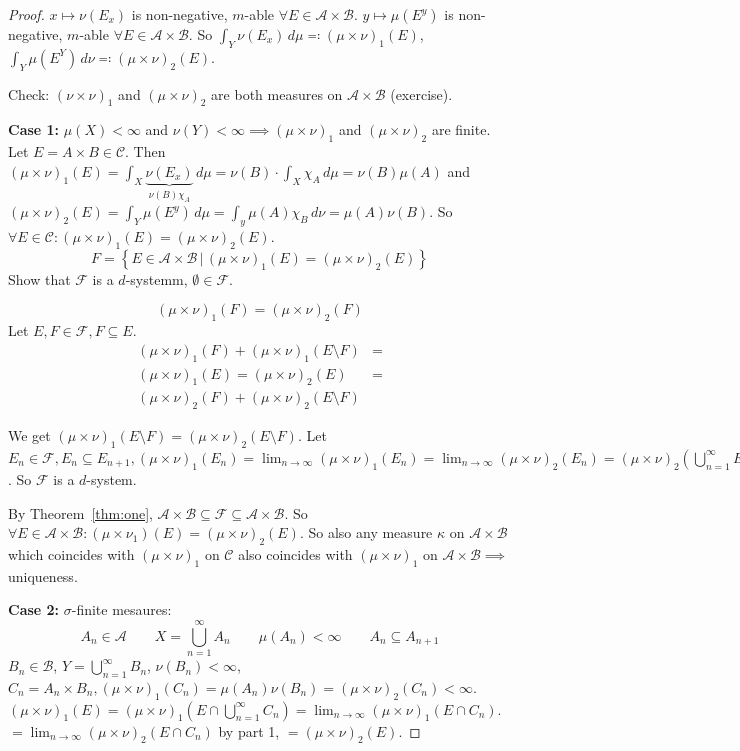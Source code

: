 \documentclass{article}
\newcommand{\setdef}[2]{\left\{\left.#1\,\right|\,#2\right\}}
\newcommand{\mtn}{(\mu\times\nu)} %
\begin{document}
\begin{proof}
  $x \mapsto \nu(E_x)$ is non-negative, $m$-able $\forall E \in \mathcal A \times \mathcal B$.
  $y \mapsto \mu(E^y)$ is non-negative, $m$-able $\forall E \in \mathcal A \times \mathcal B$.
  So $\int_Y \nu(E_x) \, d\mu \eqqcolon (\mu \times \nu)_1 (E)$, $\int_Y \mu(E^Y) \, d\nu \eqqcolon (\mu \times \nu)_2 (E)$.

  Check: $(\nu \times \nu)_1$ and $(\mu \times \nu)_2$ are both measures on $\mathcal A \times \mathcal B$ (exercise).

  \textbf{Case 1:} $\mu(X) < \infty$ and $\nu(Y) < \infty \implies (\mu \times \nu)_1$ and $(\mu \times \nu)_2$ are finite.
  Let $E = A \times B \in \mathcal C$. Then $(\mu \times \nu)_1 (E) = \int_X \underbrace{\nu(E_x)}_{\nu(B) \chi_A} \, d\mu = \nu(B) \cdot \int_X \chi_A \, d\mu = \nu(B) \mu(A)$ and $(\mu \times \nu)_2(E) = \int_Y \mu(E^y) \, d\mu = \int_y \mu(A) \chi_B \, d\nu = \mu(A) \nu(B)$.
  So $\forall E \in \mathcal C: (\mu \times \nu)_1 (E) = (\mu \times \nu)_2(E)$.
  \[ F = \setdef{E \in \mathcal A \times \mathcal B}{(\mu \times \nu)_1 (E) = (\mu \times \nu)_2 (E)} \]
  Show that $\mathcal F$ is a $d$-systemm, $\emptyset \in \mathcal F$.

  \[ (\mu \times \nu)_1(F) = (\mu \times \nu)_2(F) \]
  Let $E, F \in \mathcal F, F \subseteq E$.
  \begin{align*}
    (\mu \times \nu)_1 (F) + (\mu \times \nu)_1 (E \setminus F) &= \\
    (\mu \times \nu)_1 (E) = (\mu \times \nu)_2 (E) &= \\
    (\mu \times \nu)_2 (F) + (\mu \times \nu)_2 (E \setminus F) &
  \end{align*}

  We get $(\mu \times \nu)_1 (E \setminus F) = (\mu \times \nu)_2 (E \setminus F)$.
  Let $E_n \in \mathcal F, E_n \subseteq E_{n+1}, \mtn_1(E_n) = \lim_{n\to\infty}\mtn_1(E_n) = \lim_{n\to\infty}\mtn_2(E_n) = \mtn_2(\bigcup_{n=1}^\infty E_n)$.
  So $\mathcal F$ is a $d$-system.

  By Theorem~\ref{thm:one}, $\mathcal A \times \mathcal B \subseteq \mathcal F \subseteq \mathcal A \times \mathcal B$.
  So $\forall E \in \mathcal A \times \mathcal B: (\mu \times \nu_1)(E) = (\mu \times \nu)_2(E)$.
  So also any measure $\kappa$ on $\mathcal A \times \mathcal B$ which coincides with $\mtn_1$ on $\mathcal C$ also coincides with $\mtn_1$ on $\mathcal A \times \mathcal B \implies$ uniqueness.

  \textbf{Case 2:} $\sigma$-finite mesaures:
  \[ A_n \in \mathcal A \qquad X = \bigcup_{n=1}^\infty A_n \qquad \mu(A_n) < \infty \qquad A_n \subseteq A_{n+1} \]  %
  $B_n \in \mathcal B$, $Y = \bigcup_{n=1}^\infty B_n$, $\nu(B_n) < \infty$, $C_n = A_n \times B_n,
  \mtn_1(C_n) = \mu(A_n) \nu(B_n) = \mtn_2(C_n) < \infty$. $\mtn_1(E) = \mtn_1(E \cap \bigcup_{n=1}^\infty C_n) = \lim_{n\to\infty} \mtn_1 (E \cap C_n)$.
  $= \lim_{n\to\infty} \mtn_2 (E \cap C_n)$ by part 1, $=\mtn_2(E)$.
\end{proof}
\end{document}

